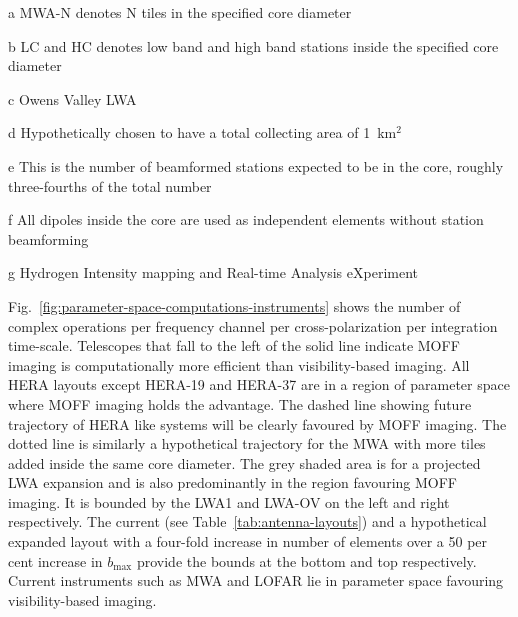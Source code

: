 \documentclass[a4paper,fleqn,usenatbib]{mnras}
\begin{document}
\begin{table}
\begin{threeparttable}
  \begin{tablenotes}
    \item[a] MWA-N denotes N tiles in the specified core diameter
    \item[b] LC and HC denotes low band and high band stations inside the 
      specified core diameter 
    \item[c] Owens Valley LWA
    \item[d] Hypothetically chosen to have a total collecting area of 
      1~km$^2$
    \item[e] This is the number of beamformed stations expected to be in the 
      core, roughly three-fourths of the total number
    \item[f] All dipoles inside the core are used as independent elements 
      without station beamforming
    \item[g] Hydrogen Intensity mapping and Real-time Analysis eXperiment
  \end{tablenotes}
  \end{threeparttable}
\end{table}

Fig.~\ref{fig:parameter-space-computations-instruments} shows the number of complex operations per frequency channel per cross-polarization per integration time-scale. Telescopes that fall to the left of the solid line indicate MOFF imaging is computationally more efficient than visibility-based imaging. All HERA layouts except HERA-19 and HERA-37 are in a region of parameter space where MOFF imaging holds the advantage. The dashed line showing future trajectory of HERA like systems will be clearly favoured by MOFF imaging. The dotted line is similarly a hypothetical trajectory for the MWA with more tiles added inside the same core diameter. The grey shaded area is for a projected LWA expansion and is also predominantly in the region favouring MOFF imaging. It is bounded by the LWA1 and LWA-OV on the left and right respectively. The current (see Table~\ref{tab:antenna-layouts}) and a hypothetical expanded layout with a four-fold increase in number of elements over a 50 per cent increase in $b_\textrm{max}$ provide the bounds at the bottom and top respectively. Current instruments such as MWA and LOFAR lie in parameter space favouring visibility-based imaging. 
\end{document}
